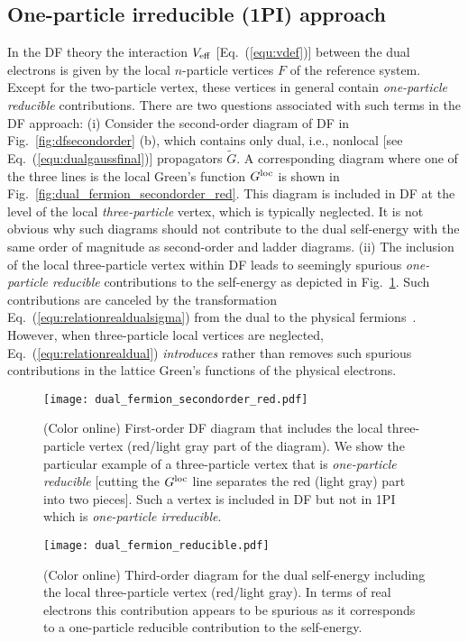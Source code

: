 \documentclass[rmp,aps,reprint,amsmath,amssymb,superscriptaddress,showpacs,nofootinbib]{revtex4-1}
\begin{document}
\subsection{One-particle irreducible (1PI) approach}
\label{subsec:1pi} 

In the DF theory the interaction $V_{\rm eff}$ [Eq.~(\ref{equ:vdef})] between the dual electrons is given by the local $n$-particle vertices $F$ of the reference system. Except for the two-particle vertex, these vertices in general contain {\sl one-particle reducible} contributions. There are two questions associated with  such terms in the DF approach: (i) Consider the second-order diagram of DF in Fig.~\ref{fig:dfsecondorder} (b), which contains only dual, i.e., nonlocal [see Eq.~(\ref{equ:dualgaussfinal})] propagators $\widetilde{G}$. A corresponding diagram where one of the three lines is the local Green's function $G^{\rm loc}$ is shown in Fig.~\ref{fig:dual_fermion_secondorder_red}. This diagram is included in DF at the level of the local {\sl three-particle} vertex, which is typically neglected. It is not obvious why such diagrams should not contribute to the dual self-energy with the same order of magnitude as second-order and ladder diagrams. (ii) The inclusion of the local three-particle vertex within DF leads to seemingly spurious {\sl one-particle reducible} contributions to the self-energy as depicted in Fig.~\ref{fig:dual_fermion_reducible}. Such contributions are canceled by the transformation Eq.~(\ref{equ:relationrealdualsigma}) from the dual to the physical fermions~\cite{Katanin2013}. However, when three-particle local vertices are neglected, Eq.~(\ref{equ:relationrealdual}) {\sl introduces} rather than removes such spurious contributions in the lattice Green's functions of the physical electrons. 
 
\begin{figure}[t]
  \centering
  \texttt{[image: dual\_fermion\_secondorder\_red.pdf]}
    \caption{(Color online) First-order DF diagram that includes the local three-particle vertex (red/light gray part of the diagram). We show the particular example of a three-particle vertex that is {\em one-particle reducible} [cutting the $G^{\rm loc}$ line separates the red (light gray) part into two pieces]. Such a vertex is included in DF but not in 1PI which is  {\em one-particle irreducible}.}	\label{fig:dual_fermion_secondorder_red}
  \centering
  \texttt{[image: dual\_fermion\_reducible.pdf]}
    \caption{(Color online) Third-order diagram for the dual self-energy including the local three-particle vertex (red/light gray). In terms of real electrons this contribution appears to be spurious as it corresponds to a one-particle reducible contribution to the self-energy.}
  \label{fig:dual_fermion_reducible}
\end{figure} 
\end{document}
